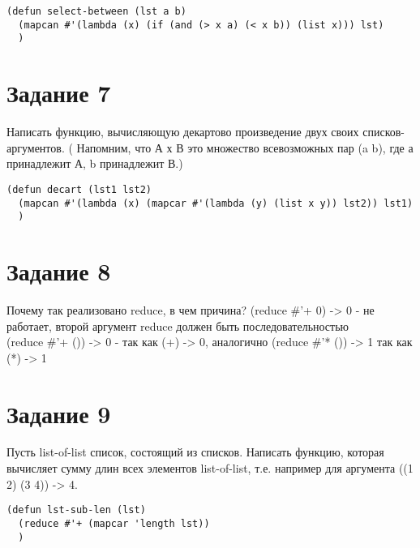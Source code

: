 \begin{lstlisting}
(defun select-between (lst a b)
  (mapcan #'(lambda (x) (if (and (> x a) (< x b)) (list x))) lst)
  )
\end{lstlisting}

\section{Задание 7}
Написать функцию, вычисляющую декартово произведение двух своих списков-аргументов. ( Напомним, что А х В это множество всевозможных пар (a b), где а принадлежит А, b принадлежит В.)

\begin{lstlisting}
(defun decart (lst1 lst2)
  (mapcan #'(lambda (x) (mapcar #'(lambda (y) (list x y)) lst2)) lst1)
  )
\end{lstlisting}

\section{Задание 8}
Почему так реализовано reduce, в чем причина?
(reduce \#'+ 0) -> 0 - не работает, второй аргумент reduce должен быть последовательностью\\
(reduce \#'+ ()) -> 0 - так как (+) -> 0, аналогично (reduce \#'* ()) -> 1 так как (*) -> 1\\

\section{Задание 9}
Пусть list-of-list список, состоящий из списков. Написать функцию, которая вычисляет сумму длин всех элементов list-of-list, т.е. например для аргумента ((1 2) (3 4)) -> 4.

\begin{lstlisting}
(defun lst-sub-len (lst)
  (reduce #'+ (mapcar 'length lst))
  )
\end{lstlisting}
